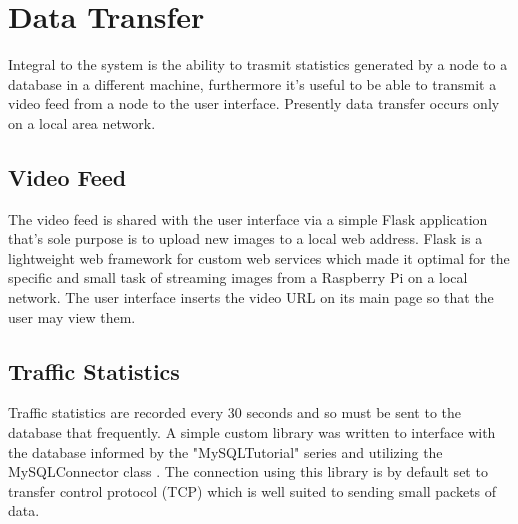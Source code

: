 \section{Data Transfer}

Integral to the system is the ability to trasmit statistics generated by a node to a database in a different machine, furthermore it's useful to be able to transmit a video feed from a node to the user interface. Presently data transfer occurs only on a local area network.

\subsection{Video Feed}

The video feed is shared with the user interface via a simple Flask \cite{flask} application that's sole purpose is to upload new images to a local web address. Flask is a lightweight web framework for custom web services which made it optimal for the specific and small task of streaming images from a Raspberry Pi on a local network. The user interface inserts the video URL on its main page so that the user may view them.


\subsection{Traffic Statistics}

Traffic statistics are recorded every 30 seconds and so must be sent to the database that frequently. A simple custom library was written to interface with the database informed by the "MySQLTutorial" series \cite{mysqltutorial} and utilizing the MySQLConnector class \cite{mysqlconnector}. The connection using this library is by default set to transfer control protocol (TCP) which is well suited to sending small packets of data. 